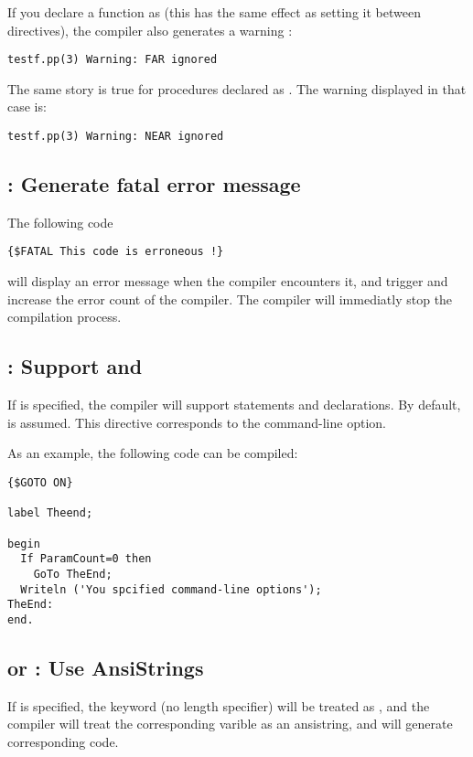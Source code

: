 \documentclass{report}
\begin{document}
If you declare a function as  (this has the same effect as setting it
between  directives), the compiler also generates a
warning :
\begin{verbatim}
testf.pp(3) Warning: FAR ignored
\end{verbatim}

The same story is true for procedures declared as . The warning
displayed in that case is:
\begin{verbatim}
testf.pp(3) Warning: NEAR ignored
\end{verbatim}

\subsection{ : Generate fatal error message}

The following code
\begin{verbatim}
{$FATAL This code is erroneous !}
\end{verbatim}
will display an error message when the compiler encounters it, and trigger
and increase the error count of the compiler.
The compiler will immediatly stop the compilation process.

\subsection{ : Support  and }

If  is specified, the compiler will support 
statements and  declarations. By default,  is
assumed. This directive corresponds to the  command-line option.

As an example, the following code can be compiled:
\begin{verbatim}
{$GOTO ON}

label Theend;

begin
  If ParamCount=0 then
    GoTo TheEnd;
  Writeln ('You spcified command-line options');
TheEnd:  
end.
\end{verbatim}

\subsection{ or  : Use AnsiStrings}

If  is specified, the keyword  (no
length specifier) will be treated as , and the compiler
will treat the corresponding varible as an ansistring, and will
generate corresponding code.
\end{document}
